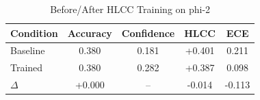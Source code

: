 \begin{table}[h]
\centering
\caption{Before/After HLCC Training on phi-2}
\begin{tabular}{lcccc}
\toprule
Condition & Accuracy & Confidence & HLCC & ECE \\
\midrule
Baseline & 0.380 & 0.181 & +0.401 & 0.211 \\
Trained & 0.380 & 0.282 & +0.387 & 0.098 \\
\midrule
$\Delta$ & +0.000 & -- & -0.014 & -0.113 \\
\bottomrule
\end{tabular}
\label{tab:training_phi-2}
\end{table}